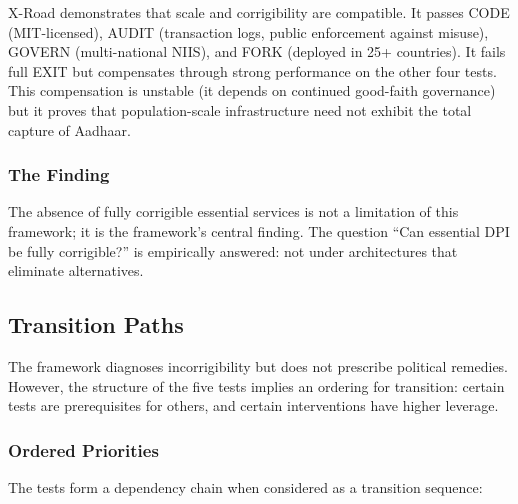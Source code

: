 \documentclass{article}
\begin{document}
X-Road demonstrates that scale and corrigibility are compatible. It passes CODE (MIT-licensed), AUDIT (transaction logs, public enforcement against misuse), GOVERN (multi-national NIIS), and FORK (deployed in 25+ countries). It fails full EXIT but compensates through strong performance on the other four tests. This compensation is unstable (it depends on continued good-faith governance) but it proves that population-scale infrastructure need not exhibit the total capture of Aadhaar.

\subsubsection{The Finding}

The absence of fully corrigible essential services is not a limitation of this framework; it is the framework's central finding. The question ``Can essential DPI be fully corrigible?'' is empirically answered: not under architectures that eliminate alternatives.

\subsection{Transition Paths}
\label{subsec:transition}

The framework diagnoses incorrigibility but does not prescribe political remedies. However, the structure of the five tests implies an ordering for transition: certain tests are prerequisites for others, and certain interventions have higher leverage.

\subsubsection{Ordered Priorities}

The tests form a dependency chain when considered as a transition sequence:
\end{document}
